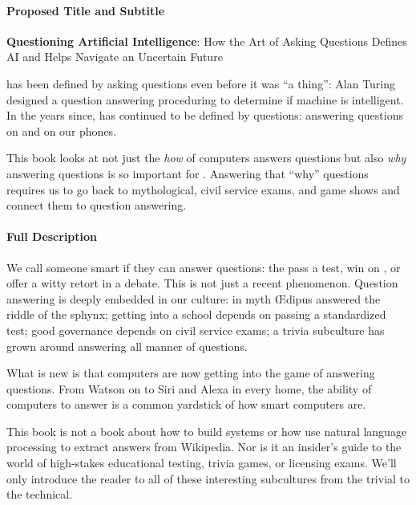 
\clearpage

\paragraph{Proposed Title and Subtitle} \vspace{3cm}

{\bf Questioning Artificial Intelligence}: How the Art of Asking Questions Defines AI and Helps Navigate an Uncertain Future

\vspace{3cm}

 has been defined by asking questions even before it was ``a
thing'': Alan Turing designed a question answering proceduring to
determine if machine is intelligent.
%
In the years since,  has continued to be defined by questions:
answering questions on \jeopardy{} and on our phones.

This book looks at not just the \emph{how} of computers answers
questions but also \emph{why} answering questions is so important
for .
%
Answering that ``why'' questions requires us to go back to
mythological, civil service exams, and game shows and connect them
to  question answering.

\paragraph{Full Description}

We call someone smart if they can answer questions: the pass a test, win
on \jeopardyp{}, or offer a witty retort in a debate.
%
This is not just a recent phenomenon.
%
Question answering is deeply embedded in
our culture:
%
in myth \OE{}dipus answered the riddle of the sphynx;
%
getting into a school depends on passing a standardized test;
%
good governance depends on civil service exams;
%
a trivia subculture has grown around answering all manner of questions.

What is new is that computers are now getting into the game of answering
questions.
%
From  Watson on \jeopardy{} to Siri and Alexa in every home, the ability of
computers to answer is a common yardstick of how smart computers are.

This book is not a book about how to build  systems or how use natural
language processing to extract answers from Wikipedia.
%
Nor is it an insider's guide to the world of high-stakes educational testing,
trivia games, or licensing exams.
%
We'll only introduce the reader to all of these interesting subcultures
from the trivial to the technical.  

